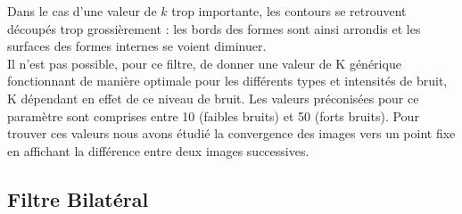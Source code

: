 \documentclass[a4,12pt]{article}
\begin{document}
Dans le cas d'une valeur de $k$ trop importante, les contours se retrouvent découpés trop grossièrement : les bords des formes sont ainsi arrondis et les surfaces des formes internes se voient diminuer.\\

Il n'est pas possible, pour ce filtre, de donner une valeur de K générique fonctionnant de manière optimale pour les différents types et intensités de bruit, K dépendant en effet de ce niveau de bruit. Les valeurs préconisées pour ce paramètre sont comprises entre  10 (faibles bruits) et 50 (forts bruits). Pour trouver ces valeurs nous avons étudié la convergence des images vers un point fixe en affichant la différence entre deux images successives.
\subsection{Filtre Bilatéral}
\end{document}
